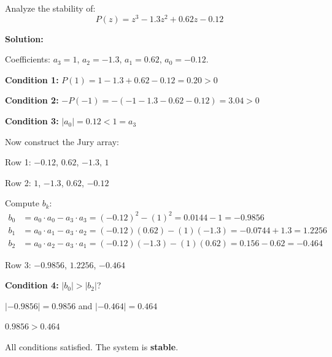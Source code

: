 \begin{example}
\label{ex:jury_third_order}

Analyze the stability of:
\begin{equation}
P(z) = z^3 - 1.3z^2 + 0.62z - 0.12
\end{equation}

\textbf{Solution:}

Coefficients: $a_3 = 1$, $a_2 = -1.3$, $a_1 = 0.62$, $a_0 = -0.12$.

\textbf{Condition 1:} $P(1) = 1 - 1.3 + 0.62 - 0.12 = 0.20 > 0$ \checkmark

\textbf{Condition 2:} $-P(-1) = -(-1 - 1.3 - 0.62 - 0.12) = 3.04 > 0$ \checkmark

\textbf{Condition 3:} $|a_0| = 0.12 < 1 = a_3$ \checkmark

Now construct the Jury array:

Row 1: $-0.12$, $0.62$, $-1.3$, $1$

Row 2: $1$, $-1.3$, $0.62$, $-0.12$

Compute $b_k$:
\begin{align}
b_0 &= a_0 \cdot a_0 - a_3 \cdot a_3 = (-0.12)^2 - (1)^2 = 0.0144 - 1 = -0.9856 \\
b_1 &= a_0 \cdot a_1 - a_3 \cdot a_2 = (-0.12)(0.62) - (1)(-1.3) = -0.0744 + 1.3 = 1.2256 \\
b_2 &= a_0 \cdot a_2 - a_3 \cdot a_1 = (-0.12)(-1.3) - (1)(0.62) = 0.156 - 0.62 = -0.464
\end{align}

Row 3: $-0.9856$, $1.2256$, $-0.464$

\textbf{Condition 4:} $|b_0| > |b_2|$?

$|-0.9856| = 0.9856$ and $|-0.464| = 0.464$

$0.9856 > 0.464$ \checkmark

All conditions satisfied. The system is \textbf{stable}.
\end{example}

